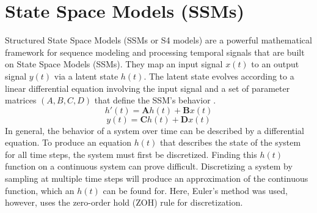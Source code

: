 \documentclass[conference]{IEEEtran}
\begin{document}
\section{State Space Models (SSMs)}
Structured State Space Models (SSMs or S4 models) are a powerful mathematical framework for sequence modeling and processing temporal signals that are built on State Space Models (SSMs). They map an input signal $x(t)$ to an output signal $y(t)$ via a latent state $h(t)$. The latent state evolves according to a linear differential equation involving the input signal and a set of parameter matrices $(A, B, C, D)$ that define the SSM's behavior \cite{gu2022efficiently}.
\begin{equation}\label{eq:SSMlatent}
    h'(t) = \mathbf{A}h(t) + \mathbf{B}x(t)
\end{equation}
\begin{equation}\label{eq:SSMoutput}
    y(t) = \mathbf{C}h(t) + \mathbf{D}x(t)
\end{equation}
In general, the behavior of a system over time can be described by a differential equation. To produce an equation $h(t)$ that describes the state of the system for all time steps, the system must first be discretized. Finding this $h(t)$ function on a continuous system can prove difficult. Discretizing a system by sampling at multiple time steps will produce an approximation of the continuous function, which an $h(t)$ can be found for. Here, Euler's method was used, however, \cite{gu2023mamba} uses the zero-order hold (ZOH) rule for discretization.
\end{document}
